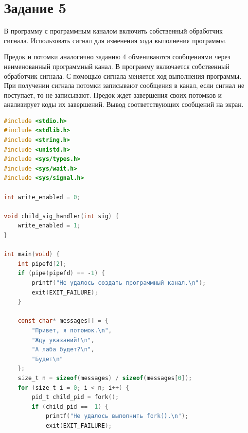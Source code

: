 \clearpage

\section{Задание 5}

В программу с программным каналом включить собственный обработчик сигнала. Использовать сигнал для изменения хода выполнения программы.

Предок и потомки аналогично заданию 4 обмениваются сообщениями через неименованный программный канал. В программу включается собственный обработчик сигнала. С помощью сигнала меняется ход выполнения программы. При получении сигнала потомки записывают сообщения в канал, если сигнал не поступает, то не записывают. Предок ждет завершения своих потомков и анализирует коды их завершений. Вывод соответствующих сообщений на экран.

\begin{lstlisting}[language=C,caption=Исходный код для задания 5 (Часть 1).]
#include <stdio.h>
#include <stdlib.h>
#include <string.h>
#include <unistd.h>
#include <sys/types.h>
#include <sys/wait.h>
#include <sys/signal.h>

int write_enabled = 0;

void child_sig_handler(int sig) {
	write_enabled = 1;
}

int main(void) {
	int pipefd[2];
	if (pipe(pipefd) == -1) {
		printf("Не удалось создать программный канал.\n");
		exit(EXIT_FAILURE);
	}
	
	const char* messages[] = {
		"Привет, я потомок.\n",
		"Жду указаний!\n",
		"А лаба будет?\n",
		"Будет\n"
	};
	size_t n = sizeof(messages) / sizeof(messages[0]);
	for (size_t i = 0; i < n; i++) {
		pid_t child_pid = fork();
		if (child_pid == -1) {
			printf("Не удалось выполнить fork().\n");
			exit(EXIT_FAILURE);
\end{lstlisting}

\clearpage

